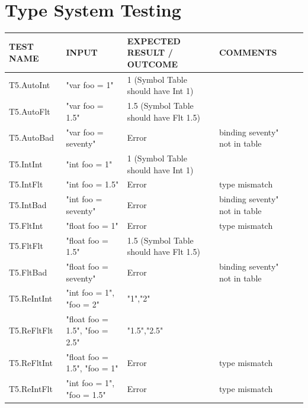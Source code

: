 \documentclass[a4paper, oneside, 11pt]{report}
\begin{document}
    \section{Type System Testing}
    \label{TypeSysTest}
    \begin{tabular}{|p{1.5in}|p{1.5in}|p{1.6in}|p{1.6in}|p{2.4in}|}
        \hline
        TEST NAME       & INPUT                     & EXPECTED RESULT / OUTCOME              & COMMENTS                                \\
        \hline
        T5.AutoInt     & "var foo = 1"                                  & 1 (Symbol Table should have Int 1)     &                                        \\
        \hline
        T5.AutoFlt     & "var foo = 1.5"                                & 1.5 (Symbol Table should have Flt 1.5)   &                                        \\
        \hline
        T5.AutoBad     & "var foo = seventy"                            & Error                                    & binding seventy" not in table          \\
        \hline
        T5.IntInt      & "int foo = 1"                                   & 1 (Symbol Table should have Int 1)     &                                        \\
        \hline
        T5.IntFlt      & "int foo = 1.5"                                 & Error                                    & type mismatch                          \\
        \hline
        T5.IntBad      & "int foo = seventy"                             & Error                                    & binding seventy" not in table          \\
        \hline
        T5.FltInt      & "float foo = 1"                                & Error                                    & type mismatch                          \\
        \hline
        T5.FltFlt      & "float foo = 1.5"                              & 1.5 (Symbol Table should have Flt 1.5)   &                                        \\
        \hline
        T5.FltBad      & "float foo = seventy"                          & Error                                    & binding seventy" not in table          \\
        \hline
        T5.ReIntInt    & "int foo = 1", "foo = 2"                          & "1","2"                                   &                                        \\
        \hline
        T5.ReFltFlt    & "float foo = 1.5", "foo = 2.5"                   & "1.5","2.5"                               &                                        \\
        \hline
        T5.ReFltInt    & "float foo = 1.5", "foo = 1"                     & Error                                    & type mismatch                          \\
        \hline
        T5.ReIntFlt    & "int foo = 1", "foo = 1.5"                        & Error                                    & type mismatch                          \\
        \hline
    \end{tabular}
\end{document}
